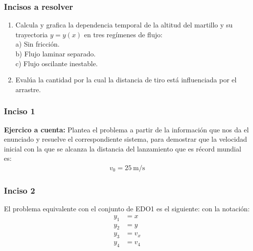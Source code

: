 \documentclass[12pt]{beamer}
\begin{document}
\begin{frame}
\frametitle{Incisos a resolver}
\begin{enumerate}[<+->]
\conti
\item Calcula y grafica la dependencia temporal de la altitud del martillo y su trayectoria $y = y (x)$ en tres regímenes de flujo:
\\
a) Sin fricción. \\
b) Flujo laminar separado. \\
c) Flujo oscilante inestable.
\item Evalúa la cantidad por la cual la distancia de tiro está influenciada por el arrastre.
\end{enumerate}
\end{frame}
\begin{frame}
\frametitle{Inciso 1}
\textbf{Ejercico a cuenta:} Plantea el problema a partir de la información que nos da el enunciado y resuelve el correspondiente sistema, para demostrar que la velocidad inicial con la que se alcanza la distancia del lanzamiento que es récord mundial es:
\pause
\begin{align*}
v_{0} =  \SI{25}{\meter\per\second}
\end{align*}
\end{frame}
\begin{frame}
\frametitle{Inciso 2}
El problema equivalente con el conjunto de EDO1 es el siguiente: \pause con la notación:
\pause
\begin{align*}
y_{1} &= x \\
y_{2} &= y \\
y_{3} &= v_{x} \\
y_{4} &= v_{4} \\
\end{align*}
\end{frame}
\end{document}
